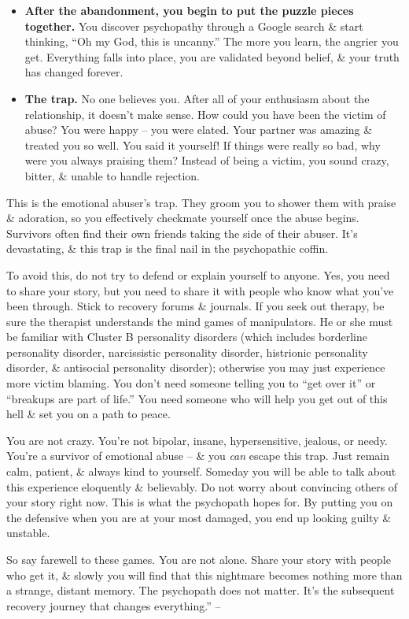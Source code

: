 \documentclass{article}
\numberwithin{equation}{section}
\begin{document}
\begin{itemize}
	\item \textbf{After the abandonment, you begin to put the puzzle pieces together.} You discover psychopathy through a Google search \& start thinking, ``Oh my God, this is uncanny.'' The more you learn, the angrier you get. Everything falls into place, you are validated beyond belief, \& your truth has changed forever.
	\item \textbf{The trap.} No one believes you. After all of your enthusiasm about the relationship, it doesn't make sense. How could you have been the victim of abuse? You were happy -- you were elated. Your partner was amazing \& treated you so well. You said it yourself! If things were really so bad, why were you always praising them? Instead of being a victim, you sound crazy, bitter, \& unable to handle rejection.
\end{itemize}
This is the emotional abuser's trap. They groom you to shower them with praise \& adoration, so you effectively checkmate yourself once the abuse begins. Survivors often find their own friends taking the side of their abuser. It's devastating, \& this trap is the final nail in the psychopathic coffin.

To avoid this, do not try to defend or explain yourself to anyone. Yes, you need to share your story, but you need to share it with people who know what you've been through. Stick to recovery forums \& journals. If you seek out therapy, be sure the therapist understands the mind games of manipulators. He or she must be familiar with Cluster B personality disorders (which includes borderline personality disorder, narcissistic personality disorder, histrionic personality disorder, \& antisocial personality disorder); otherwise you may just experience more victim blaming. You don't need someone telling you to ``get over it'' or ``breakups are part of life.'' You need someone who will help you get out of this hell \& set you on a path to peace.

You are not crazy. You're not bipolar, insane, hypersensitive, jealous, or needy. You're a survivor of emotional abuse -- \& you \textit{can} escape this trap. Just remain calm, patient, \& always kind to yourself. Someday you will be able to talk about this experience eloquently \& believably. Do not worry about convincing others of your story right now. This is what the psychopath hopes for. By putting you on the defensive when you are at your most damaged, you end up looking guilty \& unstable.

So say farewell to these games. You are not alone. Share your story with people who get it, \& slowly you will find that this nightmare becomes nothing more than a strange, distant memory. The psychopath does not matter. It's the subsequent recovery journey that changes everything.'' -- \cite[pp. 76--79]{MacKenzie2015}
\end{document}
